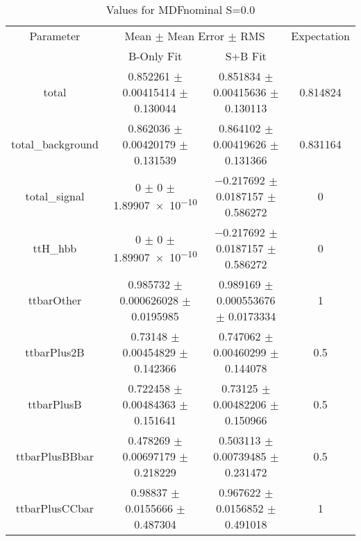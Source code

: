 \begin{table}
\centering
\caption{Values for MDFnominal S=0.0}
\begin{tabular}{cccc}
\toprule
Parameter & \multicolumn{2}{c}{Mean $\pm$ Mean Error $\pm$ RMS} & Expectation\\
 & B-Only Fit & S+B Fit & \\
\midrule
total & \num{0.852261} $\pm$ \num{0.00415414} $\pm$ \num{0.130044} & \num{0.851834} $\pm$ \num{0.00415636} $\pm$ \num{0.130113} & \num{0.814824}\\
total\_background & \num{0.862036} $\pm$ \num{0.00420179} $\pm$ \num{0.131539} & \num{0.864102} $\pm$ \num{0.00419626} $\pm$ \num{0.131366} & \num{0.831164}\\
total\_signal & \num{0} $\pm$ \num{0} $\pm$ \num{1.89907e-10} & \num{-0.217692} $\pm$ \num{0.0187157} $\pm$ \num{0.586272} & \num{0}\\
ttH\_hbb & \num{0} $\pm$ \num{0} $\pm$ \num{1.89907e-10} & \num{-0.217692} $\pm$ \num{0.0187157} $\pm$ \num{0.586272} & \num{0}\\
ttbarOther & \num{0.985732} $\pm$ \num{0.000626028} $\pm$ \num{0.0195985} & \num{0.989169} $\pm$ \num{0.000553676} $\pm$ \num{0.0173334} & \num{1}\\
ttbarPlus2B & \num{0.73148} $\pm$ \num{0.00454829} $\pm$ \num{0.142366} & \num{0.747062} $\pm$ \num{0.00460299} $\pm$ \num{0.144078} & \num{0.5}\\
ttbarPlusB & \num{0.722458} $\pm$ \num{0.00484363} $\pm$ \num{0.151641} & \num{0.73125} $\pm$ \num{0.00482206} $\pm$ \num{0.150966} & \num{0.5}\\
ttbarPlusBBbar & \num{0.478269} $\pm$ \num{0.00697179} $\pm$ \num{0.218229} & \num{0.503113} $\pm$ \num{0.00739485} $\pm$ \num{0.231472} & \num{0.5}\\
ttbarPlusCCbar & \num{0.98837} $\pm$ \num{0.0155666} $\pm$ \num{0.487304} & \num{0.967622} $\pm$ \num{0.0156852} $\pm$ \num{0.491018} & \num{1}\\
\bottomrule
\end{tabular}
\end{table}